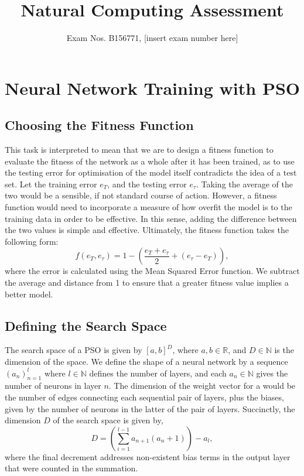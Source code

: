 \documentclass[12pt]{article}
\title{Natural Computing Assessment}
\author{Exam Nos. B156771, [insert exam number here]}
\begin{document}
\maketitle
\section{Neural Network Training with PSO}
\subsection{Choosing the Fitness Function}
This task is interpreted to mean that we are to design a fitness function to evaluate the fitness of the network as a whole after it has been trained, as to use the testing error for optimisation of the model itself contradicts the idea of a test set.
Let the training error $e_T$, and the testing error $e_\tau$. 
Taking the average of the two would be a sensible, if not standard course of action. 
However, a fitness function would need to incorporate a measure of how overfit the model is to the training data in order to be effective. 
In this sense, adding the difference between the two values is simple and effective. 
Ultimately, the fitness function takes the following form:
\begin{equation}
    f(e_T, e_\tau) = 1 - \left(\frac{e_T + e_\tau}{2} + \left(e_\tau - e_T\right)\right),
\end{equation}
where the error is calculated using the Mean Squared Error function. We subtract the average and distance from 1 to ensure that a greater fitness value implies a better model.

\subsection{Defining the Search Space}
The search space of a PSO is given by $[a,b]^D$, where $a,b\in \mathbb{R}$, and $D\in\mathbb{N}$ is the dimension of the space. 
We define the shape of a neural network by a sequence $(a_n)_{n=1}^{l}$ where $l\in\mathbb{N}$ defines the number of layers, and each $a_n \in \mathbb{N}$ gives the number of neurons in layer $n$. 
The dimension of the weight vector for a would be the number of edges connecting each sequential pair of layers, plus the biases, given by the number of neurons in the latter of the pair of layers. Succinctly, the dimension $D$ of the search space is given by,
\begin{equation}
    D = \left(\sum_{i=1}^{l-1} a_{n+1}\left(a_n + 1\right)\right) - a_l,
\end{equation}
where the final decrement addresses non-existent bias terms in the output layer that were counted in the summation.
\end{document}

